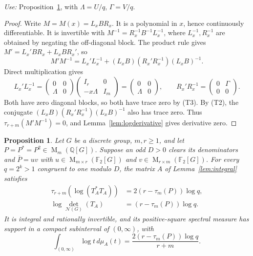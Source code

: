 \documentclass[11pt]{article}
\newtheorem{proposition}[theorem]{Proposition}
\theoremstyle{remark}
\numberwithin{equation}{section}
\newcommand{\F}{\mathbb F}
\newcommand{\Q}{\mathbb Q}
\newcommand{\Mat}{\operatorname{M}}
\newcommand{\N}{\mathcal N}
\begin{document}
\emph{Use:} Proposition~\ref{prop:criterion}, with $\Lambda=U/q$, $\Gamma=V/q$.

\begin{proof}
Write $M=M(x)=L_xBR_x$. It is a polynomial in $x$, hence continuously differentiable. It is invertible with $M^{-1}=R_x^{-1}B^{-1}L_x^{-1}$, where $L_x^{-1},R_x^{-1}$ are obtained by negating the off-diagonal block. The product rule gives $M'=L_x'BR_x+L_xBR_x'$, so
\[
 M'M^{-1}=L_x'L_x^{-1}
 +(L_xB)(R_x'R_x^{-1})(L_xB)^{-1}.
\]
Direct multiplication gives
\[
 L_x'L_x^{-1}=\begin{pmatrix}0&0\\\Lambda&0\end{pmatrix}\begin{pmatrix}I_r&0\\-x\Lambda&I_m\end{pmatrix}=\begin{pmatrix}0&0\\\Lambda&0\end{pmatrix},
 \qquad
 R_x'R_x^{-1}=\begin{pmatrix}0&\Gamma\\0&0\end{pmatrix}.
\]
Both have zero diagonal blocks, so both have trace zero by (T3). By (T2), the conjugate $(L_xB)(R_x'R_x^{-1})(L_xB)^{-1}$ also has trace zero. Thus $\tau_{r+m}(M'M^{-1})=0$, and Lemma~\ref{lem:logderivative} gives derivative zero.
\end{proof}

\begin{proposition}\label{prop:criterion}
Let $G$ be a discrete group, $m,r\ge1$, and let
$P=P^*=P^2\in\Mat_m(\Q[G])$. Suppose an odd $D>0$ clears its
denominators and $\bar P=uv$ with
$u\in\Mat_{m\times r}(\F_2[G])$ and
$v\in\Mat_{r\times m}(\F_2[G])$. For every $q=2^k>1$ congruent to one
modulo $D$, the matrix $A$ of Lemma~\ref{lem:integral} satisfies
\begin{align}
 \tau_{r+m}(\log(T_A^*T_A))
   &=2(r-\tau_m(P))\log q,\label{eq:criterion-trace}\\
 \log\det_{\N(G)}(T_A)&=(r-\tau_m(P))\log q.
 \label{eq:criterion-det}
\end{align}
It is integral and rationally invertible, and its positive-square
spectral measure has support in a compact subinterval of $(0,\infty)$, with
\begin{equation}\label{eq:criterion-integral}
 \int_{(0,\infty)}\log t\,d\mu_A(t)
 =\frac{2(r-\tau_m(P))\log q}{r+m}.
\end{equation}
\end{proposition}
\end{document}

